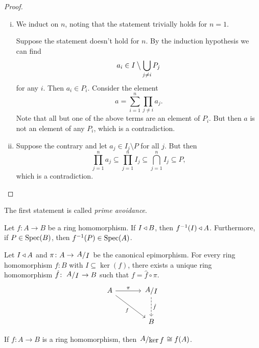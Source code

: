 \begin{proof}
\phantom{i}
\begin{enumerate}[i)]
\item We induct on $n$, noting that the statement trivially holds
for $n=1$.

Suppose the statement doesn't hold for $n$. By the induction
hypothesis we can find
\[
a_i \in I \mathbin{\big\backslash} \bigcup_{j \ne i} P_j
\]
for any $i$. Then $a_i \in P_i$. Consider the element
\[
a = \sum_{i=1}^n \prod_{j \ne i} a_j.
\]
Note that all but one of the above terms are an element of $P_i$.
But then $a$ is not an element of any $P_i$, which is a
contradiction.
\item Suppose the contrary and let $a_j \in I_j \setminus P$ for
all $j$. But then
\[
\prod_{j=1}^n a_j \subseteq
\prod_{j=1}^n I_j \subseteq
\bigcap_{j=1}^n I_j \subseteq
P,
\]
which is a contradiction. \qedhere
\end{enumerate}
\end{proof}

\begin{opomba}
The first statement is called
\emph{prime avoidance}.
\end{opomba}

\begin{trditev}
Let $f \colon A \to B$ be a ring homomorphism. If
$I \triangleleft B$, then $f^{-1}(I) \triangleleft A$. Furthermore, if
$P \in \operatorname{Spec}(B)$, then $f^{-1}(P) \in \operatorname{Spec}(A)$.
\end{trditev}

\begin{trditev}
Let $I \triangleleft A$ and $\pi \colon A \to \kvoc{A}{I}$ be the canonical
epimorphism. For every ring homomorphism $f \colon B$ with
$I \subseteq \ker(f)$, there exists a unique ring homomorphism
$\hat{f} \colon \kvoc{A}{I} \to B$ such that
$f = \hat{f} \circ \pi$.
\[
\begin{tikzcd}[row sep=large, column sep=large]
A \arrow[r, "\pi"] \arrow[rd, "f"'] &
\kvoc{A}{I} \arrow[d, dashed, "\hat{f}"] \\ &
B
\end{tikzcd}
\]
\end{trditev}

\begin{posledica}
If $f \colon A \to B$ is a ring homomorphism, then
$\kvoc{A}{\ker f} \cong f(A)$.
\end{posledica}

